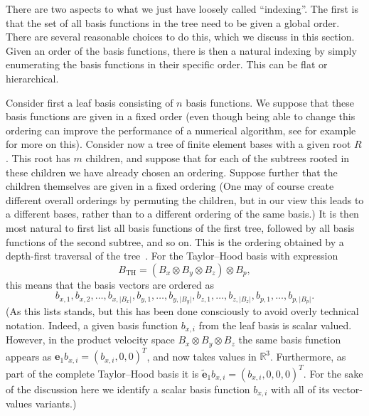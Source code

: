 \documentclass[a4paper,10pt,headings=normal,bibliography=totoc]{scrartcl}
\newcommand{\R}{\mathbb{R}}
\newcommand{\abs}[1]{{\lvert#1\rvert}}
\begin{document}
There are two aspects to what we just have loosely called ``indexing''.  The first is that the set of all basis functions
in the tree need to be given a global order.  There are several reasonable choices to do this, which we discuss
in this section.
Given an order of the basis functions, there is then a natural indexing by simply enumerating the basis functions in
their specific order. This can be flat or hierarchical.

Consider first a leaf basis consisting of $n$ basis functions.  We suppose that these basis functions are given in a fixed
order (even though being able to change this ordering can improve the performance of a numerical
algorithm, see for example \cite{bader:2013,ordering_for_gauss_seidel} for more on this).
Consider now a tree of finite element bases with a given root $R$.  This root has $m$ children, and suppose that for
each of the subtrees rooted in these children we have already chosen an ordering.  Suppose further that the children themselves are given
in a fixed ordering (One may of course create different overall orderings by permuting the children, but in our view
this leads to a different bases, rather than to a different ordering of the same basis.)  It is then most natural
to first list all basis functions of the first tree, followed by all basis functions of the second subtree,
and so on.  This is the ordering obtained by a depth-first traversal of the tree~\cite{cormen:1990}.
For the Taylor--Hood basis with expression
\begin{equation*}
 B_\text{TH}
 =
 (B_x \otimes B_y \otimes B_z) \otimes B_p,
\end{equation*}
this means that the basis vectors are ordered as
\begin{equation*}
 b_{x,1}, b_{x,2}, \dots, b_{x,\abs{B_x}},
 b_{y,1}, \dots, b_{y,\abs{B_y}},
 b_{z,1}, \dots, b_{z,\abs{B_z}},
 b_{p,1}, \dots, b_{p,\abs{B_p}}.
\end{equation*}
(As this lists stands, but this has been done consciously to avoid overly technical notation.  Indeed, a given basis
function $b_{x,i}$ from the leaf basis is scalar valued.  However, in the product velocity space
$B_x \otimes B_y \otimes B_z$ the same basis function appears as $\mathbf{e}_1 b_{x,i} = (b_{x,i},0,0)^T$,
and now takes values in $\R^3$.  Furthermore, as part of the complete Taylor--Hood basis it is
$\tilde{\mathbf{e}}_1 b_{x,i} = (b_{x,i},0,0,0)^T$.  For the sake of the discussion here we identify a scalar
basis function $b_{x,i}$ with all of its vector-values variants.)
\end{document}
